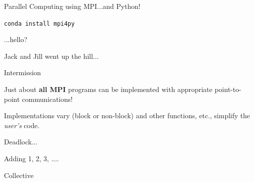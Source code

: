 \documentclass[10pt]{beamer}
\begin{document}
\begin{frame}{Parallel Computing using MPI...and Python!}

{\tt conda install mpi4py}

\end{frame}

\begin{frame}{...hello?}



\end{frame}

\begin{frame}{Jack and Jill went up the hill...}



\end{frame}

\begin{frame}{Intermission}

Just about {\bf all MPI} programs can be implemented with appropriate
point-to-point communications!

\vfill 

Implementations vary (block or non-block) and other 
functions, etc., simplify the {\it user's} code.

\end{frame}

\begin{frame}{Deadlock...}



\end{frame}

\begin{frame}{Adding 1, 2, 3, ....}



\end{frame}

\begin{frame}{Collective}



\end{frame}
\end{document}
